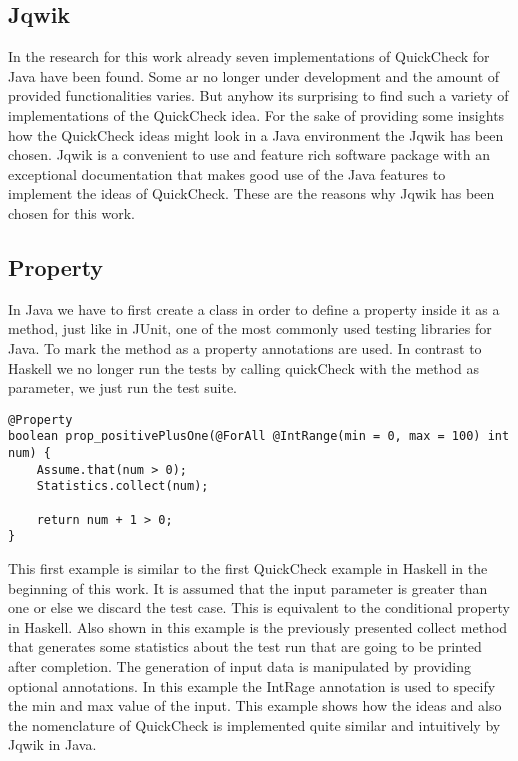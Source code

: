\documentclass[a4paper, 12pt]{article} %
\begin{document}
\subsection{Jqwik}

In the research for this work already seven implementations of QuickCheck for Java have been found. Some ar no longer under development and the amount of provided functionalities varies. But anyhow its surprising to find such a variety of implementations of the QuickCheck idea. For the sake of providing some insights how the QuickCheck ideas might look in a Java environment the Jqwik \cite{jqwik} has been chosen. Jqwik is a convenient to use and feature rich software package with an exceptional documentation that makes good use of the Java features to implement the ideas of QuickCheck. These are the reasons why Jqwik has been chosen for this work.

\subsection{Property}

In Java we have to first create a class in order to define a property inside it as a method, just like in JUnit, one of the most commonly used testing libraries for Java. To mark the method as a property annotations are used. In contrast to Haskell we no longer run the tests by calling quickCheck with the method as parameter, we just run the test suite. 

\begin{verbatim}
@Property
boolean prop_positivePlusOne(@ForAll @IntRange(min = 0, max = 100) int num) {
    Assume.that(num > 0);
    Statistics.collect(num);
    
    return num + 1 > 0;
}
\end{verbatim}

This first example is similar to the first QuickCheck example in Haskell in the beginning of this work. It is assumed that the input parameter is greater than one or else we discard the test case. This is equivalent to the conditional property in Haskell. Also shown in this example is the previously presented collect method that generates some statistics about the test run that are going to be printed after completion. The generation of input data is manipulated by providing optional annotations. In this example the IntRage annotation is used to specify the min and max value of the input. This example shows how the ideas and also the nomenclature of QuickCheck is implemented quite similar and intuitively by Jqwik in Java.
\end{document}
